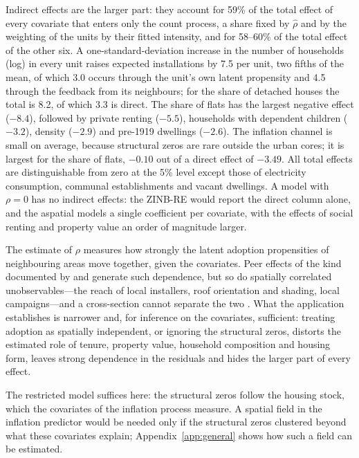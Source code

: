 Indirect effects are the larger part: they account for 59\% of the total effect of every covariate that enters only the count process, a share fixed by $\hat\rho$ and by the weighting of the units by their fitted intensity, and for 58--60\% of the total effect of the other six.
A one-standard-deviation increase in the number of households (log) in every unit raises expected installations by 7.5 per unit, two fifths of the mean, of which 3.0 occurs through the unit's own latent propensity and 4.5 through the feedback from its neighbours; for the share of detached houses the total is 8.2, of which 3.3 is direct.
The share of flats has the largest negative effect ($-8.4$), followed by private renting ($-5.5$), households with dependent children ($-3.2$), density ($-2.9$) and pre-1919 dwellings ($-2.6$).
The inflation channel is small on average, because structural zeros are rare outside the urban cores; it is largest for the share of flats, $-0.10$ out of a direct effect of $-3.49$.
All total effects are distinguishable from zero at the 5\% level except those of electricity consumption, communal establishments and vacant dwellings.
A model with $\rho = 0$ has no indirect effects: the ZINB-RE would report the direct column alone, and the aspatial models a single coefficient per covariate, with the effects of social renting and property value an order of magnitude larger.

The estimate of $\rho$ measures how strongly the latent adoption propensities of neighbouring areas move together, given the covariates.
Peer effects of the kind documented by \citet{bollinger_gillingham2012} and \citet{graziano_gillingham2015} generate such dependence, but so do spatially correlated unobservables---the reach of local installers, roof orientation and shading, local campaigns---and a cross-section cannot separate the two \citep{manski1993,gibbons_overman2012}.
What the application establishes is narrower and, for inference on the covariates, sufficient: treating adoption as spatially independent, or ignoring the structural zeros, distorts the estimated role of tenure, property value, household composition and housing form, leaves strong dependence in the residuals and hides the larger part of every effect.

The restricted model suffices here: the structural zeros follow the housing stock, which the covariates of the inflation process measure.
A spatial field in the inflation predictor would be needed only if the structural zeros clustered beyond what these covariates explain; Appendix~\ref{app:general} shows how such a field can be estimated.
